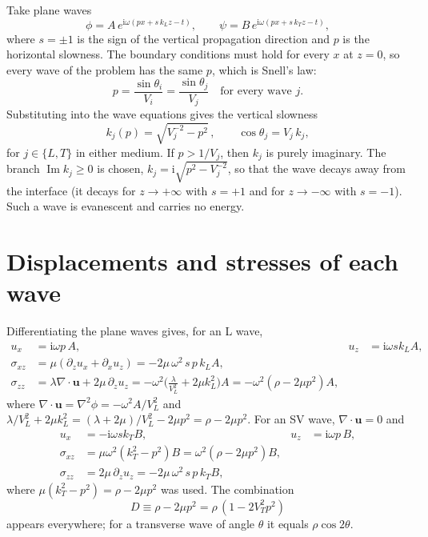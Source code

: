 \documentclass[11pt,a4paper]{article}
\newcommand{\ii}{\mathrm{i}}
\newcommand{\uu}{\mathbf{u}}
\begin{document}
Take plane waves
\begin{equation}
  \phi=A\,e^{\ii\omega(px+s\,k_L z-t)},\qquad
  \psi=B\,e^{\ii\omega(px+s\,k_T z-t)} ,
\end{equation}
where $s=\pm1$ is the sign of the vertical propagation direction and $p$ is the horizontal
slowness. The boundary conditions must hold for every $x$ at $z=0$, so every wave of the
problem has the same $p$, which is Snell's law:
\begin{equation}
  p=\frac{\sin\theta_i}{V_i}=\frac{\sin\theta_j}{V_j}\quad\text{for every wave } j .
\end{equation}
Substituting into the wave equations gives the vertical slowness
\begin{equation}
  k_{j}(p)=\sqrt{V_j^{-2}-p^{2}}\,,\qquad \cos\theta_j=V_j\,k_j ,
  \label{eq:kz}
\end{equation}
for $j\in\{L,T\}$ in either medium. If $p>1/V_j$, then $k_j$ is purely imaginary. The branch
$\operatorname{Im}k_j\ge0$ is chosen, $k_j=\ii\sqrt{p^2-V_j^{-2}}$, so that the wave decays
away from the interface (it decays for $z\to+\infty$ with $s=+1$ and for $z\to-\infty$ with
$s=-1$). Such a wave is evanescent and carries no energy.

\section{Displacements and stresses of each wave}

Differentiating the plane waves gives, for an L wave,
\begin{align}
  u_x&=\ii\omega p\,A, & u_z&=\ii\omega s k_L A,\\
  \sigma_{xz}&=\mu(\partial_zu_x+\partial_xu_z)=-2\mu\,\omega^2\,s\,p\,k_L A,\\
  \sigma_{zz}&=\lambda\nabla\!\cdot\!\uu+2\mu\,\partial_zu_z
   =-\omega^2\Big(\tfrac{\lambda}{V_L^2}+2\mu k_L^2\Big)A
   =-\omega^2(\rho-2\mu p^2)A ,
\end{align}
where $\nabla\!\cdot\!\uu=\nabla^2\phi=-\omega^2A/V_L^2$ and
$\lambda/V_L^2+2\mu k_L^2=(\lambda+2\mu)/V_L^2-2\mu p^2=\rho-2\mu p^2$. For an SV wave,
$\nabla\!\cdot\!\uu=0$ and
\begin{align}
  u_x&=-\ii\omega s k_T B, & u_z&=\ii\omega p\,B,\\
  \sigma_{xz}&=\mu\omega^2(k_T^2-p^2)B=\omega^2(\rho-2\mu p^2)B,\\
  \sigma_{zz}&=2\mu\,\partial_zu_z=-2\mu\,\omega^2\,s\,p\,k_T B ,
\end{align}
where $\mu(k_T^2-p^2)=\rho-2\mu p^2$ was used. The combination
\begin{equation}
  D\equiv\rho-2\mu p^2=\rho\,(1-2V_T^2p^2)
\end{equation}
appears everywhere; for a transverse wave of angle $\theta$ it equals $\rho\cos2\theta$.
\end{document}
